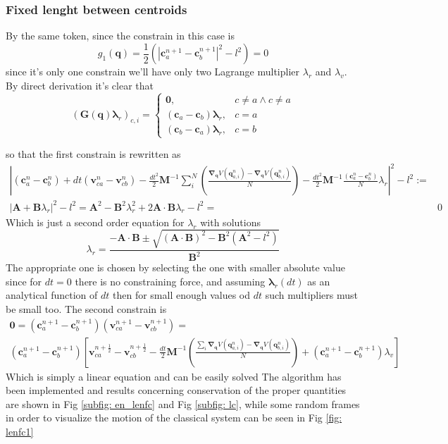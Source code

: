 \documentclass[10pt,a4paper]{article}
\begin{document}
\subsubsection{Fixed lenght between centroids}
By the same token, since the constrain in this case is
\[ g_1(\bm{q})=\frac{1}{2}(|\bm{c}_a^{n+1} -\bm{c}_b^{n+1}|^2-l^2)=0  \]
since it's only one constrain we'll have only two Lagrange multiplier $\lambda_r$ and $\lambda_v$.
By direct derivation it's clear that 
\[
(\bm{G}(\bm{q})\bm{\lambda}_r)_{c,i} = \left\{\begin{array}{lr}
\bm{0}, & c\neq a  \wedge c \neq a\\
(\bm{c}_a -\bm{c}_b)\bm{\lambda}_r, & c=a\\
(\bm{c}_b -\bm{c}_a)\bm{\lambda}_r, & c=b
\end{array}\right.\]

so that the first constrain is rewritten as
\begin{align*}
| (\bm{c}_a^n-\bm{c}_b^n)+dt(\bm{v}_{ca}^n-\bm{v}_{cb}^n) - \frac{dt^2}{2} \bm{M}^{-1}\sum_i^N\left(\frac{  \bm{\nabla}_{\bm q}V(\bm{q}_{a,i}^{n})-\bm{\nabla}_{\bm q}V(\bm{q}_{b,i}^{n})}{N}\right) - \frac{dt^2}{2} \bm{M}^{-1} \frac{(\bm{c}_a^n-\bm{c}_b^n)}{N}\lambda_r |^2 - l^2 :=& \\
|\bm{A}+\bm{B}\lambda_r|^2 - l^2 = \bm{A}^2-\bm{B}^2\lambda_r^2 +2\bm{A}\cdot\bm{B}\lambda_r -l^2 = &0 
\end{align*}
Which is just a second order equation for $\lambda_r$ with solutions
\[\lambda_r = \frac{-\bm{A}\cdot\bm{B} \pm \sqrt{(\bm{A}\cdot\bm{B})^2-\bm{B}^2(\bm{A}^2-l^2)} }{\bm{B}^2} \]
The appropriate one is chosen by selecting the one with smaller absolute value since for $dt=0$ there is no constraining force, and assuming $\bm{\lambda}_r(dt)$ as an analytical function of $dt$ then for small enough values od $dt$ such multipliers must be small too.
The second constrain is 
\begin{align*}
 \bm{0}=(\bm{c}_a^{n+1}-\bm{c}_b^{n+1})(\bm{v}_{ca}^{n+1}-\bm{v}_{cb}^{n+1})=\\ (\bm{c}_a^{n+1}-\bm{c}_b^{n+1}) [\bm{v}_{ca}^{n+\frac{1}{2}}-\bm{v}_{cb}^{n+\frac{1}{2}}-\frac{dt}{2}\bm{M}^{-1}\left(\frac{\sum_i \bm{\nabla}_{\bm q}V(\bm{q}_{a,i}^{n})-\bm{\nabla}_{\bm q}V(\bm{q}_{b,i}^{n})}{N}\right)+(\bm{c}_a^{n+1}-\bm{c}_b^{n+1})\lambda_v]
\end{align*}
Which is simply a linear equation and can be easily solved
The algorithm has been implemented and results concerning conservation of the proper quantities are shown in Fig \ref{subfig: en_lenfc} and Fig \ref{subfig: lc}, while some random frames in order to visualize the motion of the classical system can be seen in Fig \ref{fig: lenfc1}
\end{document}

